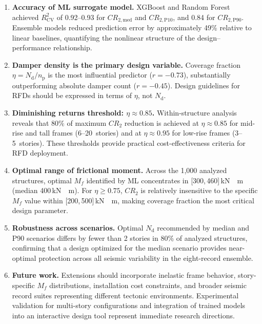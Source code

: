 \documentclass[preprint,12pt,authoryear]{elsarticle}
\newcommand{\CR}[1]{CR_{2,\text{#1}}}
\newcommand{\Rsq}{R^{2}_{\mathrm{CV}}}
\newcommand{\nd}{N_{\mathrm{d}}}
\newcommand{\np}{n_{\mathrm{p}}}              %
\newcommand{\etad}{\eta}
\newcommand{\Mf}{M_{\!f}}
\newcommand{\KM}{\,\si{kN{\cdot}m}}
\begin{document}
\begin{enumerate}

\item \textbf{Accuracy of ML surrogate model.}
XGBoost and Random Forest achieved $\Rsq$ of 0.92--0.93 for $\CR{med}$ and $\CR{P10}$, and 0.84 for
$\CR{P90}$. Ensemble models reduced prediction error by approximately 49\% relative to linear baselines,
quantifying the nonlinear structure of the design--performance relationship.

\item \textbf{Damper density is the primary design variable.}
Coverage fraction $\etad = \nd/\np$ is the most influential predictor ($r = -0.73$), substantially
outperforming absolute damper count ($r = -0.45$). Design guidelines for RFDs should be expressed in
terms of $\etad$, not $\nd$.

\item \textbf{Diminishing returns threshold: $\etad \approx 0.85$.}
Within-structure analysis reveals that 80\% of maximum $CR_2$ reduction is achieved at $\etad \approx 0.85$
for mid-rise and tall frames (6--20~stories) and at $\etad \approx 0.95$ for low-rise frames (3--5~stories).
These thresholds provide practical cost-effectiveness criteria for RFD deployment.

\item \textbf{Optimal range of frictional moment.}
Across the 1,000 analyzed structures, optimal $\Mf$ identified by ML concentrates in [300,\,460]\KM
(median 400\KM). For $\etad \geq 0.75$, $CR_2$ is relatively insensitive to the specific $\Mf$ value
within [200,\,500]\KM, making coverage fraction the most critical design parameter.

\item \textbf{Robustness across scenarios.}
Optimal $\nd$ recommended by median and P90 scenarios differs by fewer than 2 stories in 80\% of analyzed
structures, confirming that a design optimized for the median scenario provides near-optimal protection
across all seismic variability in the eight-record ensemble.

\item \textbf{Future work.}
Extensions should incorporate inelastic frame behavior, story-specific $\Mf$ distributions, installation
cost constraints, and broader seismic record suites representing different tectonic environments.
Experimental validation for multi-story configurations and integration of trained models into an
interactive design tool represent immediate research directions.

\end{enumerate}



\end{document}
